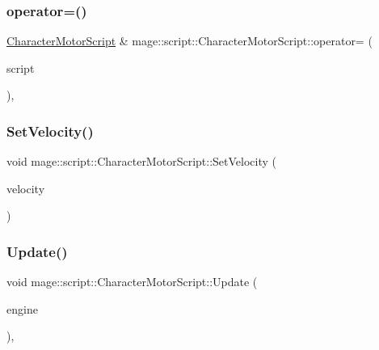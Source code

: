 \subsubsection{\texorpdfstring{operator=()}{operator=()}\hspace{0.1cm}{\footnotesize\ttfamily [2/2]}}
{\footnotesize\ttfamily \hyperlink{classmage_1_1script_1_1_character_motor_script}{Character\+Motor\+Script} \& mage\+::script\+::\+Character\+Motor\+Script\+::operator= (\begin{DoxyParamCaption}\item[{\hyperlink{classmage_1_1script_1_1_character_motor_script}{Character\+Motor\+Script} \&\&}]{script }\end{DoxyParamCaption})\hspace{0.3cm}{\ttfamily [default]}, {\ttfamily [noexcept]}}

\hypertarget{classmage_1_1script_1_1_character_motor_script_a51c9b8317670fc0ae554bfb0cac11aee}{}\label{classmage_1_1script_1_1_character_motor_script_a51c9b8317670fc0ae554bfb0cac11aee} 
\subsubsection{\texorpdfstring{Set\+Velocity()}{SetVelocity()}}
{\footnotesize\ttfamily void mage\+::script\+::\+Character\+Motor\+Script\+::\+Set\+Velocity (\begin{DoxyParamCaption}\item[{\hyperlink{namespacemage_aa97e833b45f06d60a0a9c4fc22ae02c0}{F32}}]{velocity }\end{DoxyParamCaption})\hspace{0.3cm}{\ttfamily [noexcept]}}

\hypertarget{classmage_1_1script_1_1_character_motor_script_ae738c9550e17be133291ccd2a6681368}{}\label{classmage_1_1script_1_1_character_motor_script_ae738c9550e17be133291ccd2a6681368} 
\subsubsection{\texorpdfstring{Update()}{Update()}}
{\footnotesize\ttfamily void mage\+::script\+::\+Character\+Motor\+Script\+::\+Update (\begin{DoxyParamCaption}\item[{\mbox{[}\mbox{[}maybe\+\_\+unused\mbox{]} \mbox{]} \hyperlink{classmage_1_1_engine}{Engine} \&}]{engine }\end{DoxyParamCaption})\hspace{0.3cm}{\ttfamily [override]}, {\ttfamily [virtual]}}

